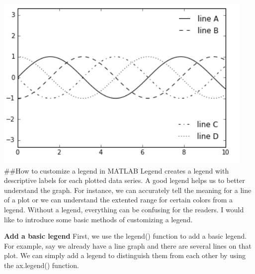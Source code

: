 \documentclass[]{book}
\newenvironment{Shaded}{\begin{snugshade}}{\end{snugshade}}
\newcommand{\KeywordTok}[1]{\textcolor[rgb]{0.13,0.29,0.53}{\textbf{#1}}}
\newcommand{\DataTypeTok}[1]{\textcolor[rgb]{0.13,0.29,0.53}{#1}}
\newcommand{\NormalTok}[1]{#1}
\begin{document}
\includegraphics{images/legend5.png} \#\#How to customize a legend in
MATLAB Legend creates a legend with descriptive labels for each plotted
data series. A good legend helps us to better understand the graph. For
instance, we can accurately tell the meaning for a line of a plot or we
can understand the extented range for certain colors from a legend.
Without a legend, everything can be confusing for the readers. I would
like to introduce some basic methods of customizing a legend.

\textbf{Add a basic legend} First, we use the legend() function to add a
basic legend. For example, say we already have a line graph and there
are several lines on that plot. We can simply add a legend to
distinguish them from each other by using the ax.legend() function.

\begin{Shaded}
\end{Shaded}
\end{document}
